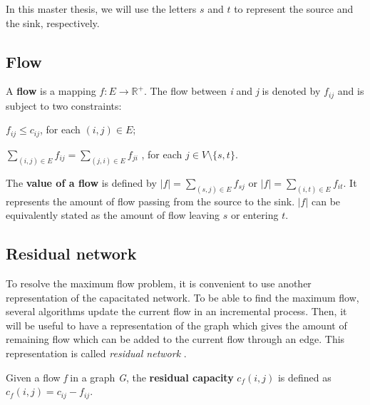 In this master thesis, we will use the letters $s$ and $t$ to represent the source and the sink, respectively.

\subsection{Flow}
\begin{definition}
\label{flow}
A \textbf{flow} is a mapping $f: E \to \mathbb{R}^{+}$. The flow between \textit{i} and \textit{j} is denoted by $f_{ij}$ and is subject to two constraints:
\indent
\begin{description}
	\label{cap_constraint}
	\item[Capacity constraint] $f_{ij} \leq c_{ij}$, for each $(i, j) \in E$;
	\label{flow_constraint}
	\item[Flow conservation constraint] $\sum\limits_{(i, j) \in E} f_{ij} = \sum\limits_{(j, i) \in E} f_{ji}$ , for each $j \in V \setminus \{s, t\}$.
\end{description}
\end{definition}

\begin{definition}
\label{vflow}
The \textbf{value of a flow} is defined by $\left\vert{f}\right\vert = \sum\limits_{(s,j) \in E} f_{sj}$ or $\left\vert{f}\right\vert = \sum\limits_{(i,t) \in E} f_{it}$. It represents the amount of flow passing from the source to the sink. $\left\vert{f}\right\vert$ can be equivalently stated as the amount of flow leaving $s$ or entering $t$.

\end{definition}


\subsection{Residual network} 
To resolve the maximum flow problem, it is convenient to use another representation of the capacitated network. To be able to find the maximum flow, several algorithms update the current flow in an incremental process. Then, it will be useful to have a representation of the graph which gives the amount of remaining flow which can be added to the current flow through an edge. This representation is called \textit{residual network} \cite{networkflows}.
\begin{definition}
\label{rcapacity}
Given a flow \textit{f} in a graph \textit{G}, the \textbf{residual capacity} $c_f (i,j)$ is defined as $c_f (i,j) = c_{ij} - f_{ij}$.
\end{definition}



